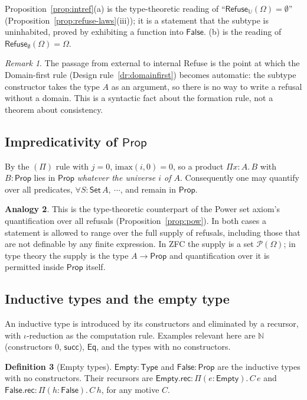 \documentclass[11pt]{article}
\newcommand{\Refuse}{\mathsf{Refuse}}
\newcommand{\U}{\mathbb{U}}
\newcommand{\Om}{\Omega}
\newcommand{\Prop}{\mathsf{Prop}}
\newcommand{\Type}{\mathsf{Type}}
\newcommand{\imax}{\mathrm{imax}}
\newcommand{\Pow}{\mathcal{P}}
\theoremstyle{definition}
\newtheorem{definition}{Definition}[section]
\newtheorem{analogy}[definition]{Analogy}
\theoremstyle{plain}
\theoremstyle{remark}
\newtheorem{remark}[definition]{Remark}
\begin{document}
Proposition~\ref{prop:intref}(a) is the type-theoretic reading of ``$\Refuse_{\U}(\Om)=\emptyset$'' (Proposition~\ref{prop:refuse-laws}(iii)); it is a statement that the subtype is uninhabited, proved by exhibiting a function into $\mathsf{False}$. (b) is the reading of $\Refuse_\emptyset(\Om)=\Om$.

\begin{remark}
The passage from external to internal Refuse is the point at which the Domain-first rule (Design rule~\ref{dr:domainfirst}) becomes automatic: the subtype constructor takes the type $A$ as an argument, so there is no way to write a refusal without a domain. This is a syntactic fact about the formation rule, not a theorem about consistency.
\end{remark}

\subsection{Impredicativity of $\Prop$}

By the $(\Pi)$ rule with $j=0$, $\imax(i,0)=0$, so a product $\Pi x{:}A.\,B$ with $B:\Prop$ lies in $\Prop$ \emph{whatever the universe $i$ of $A$}. Consequently one may quantify over all predicates, $\forall S:\mathsf{Set}\,A,\ \cdots$, and remain in $\Prop$.

\begin{analogy}\label{an:impred}
This is the type-theoretic counterpart of the Power set axiom's quantification over all refusals (Proposition~\ref{prop:pow}). In both cases a statement is allowed to range over the full supply of refusals, including those that are not definable by any finite expression. In ZFC the supply is a set $\Pow(\Om)$; in type theory the supply is the type $A\to\Prop$ and quantification over it is permitted inside $\Prop$ itself.
\end{analogy}

\subsection{Inductive types and the empty type}

An inductive type is introduced by its constructors and eliminated by a recursor, with $\iota$-reduction as the computation rule. Examples relevant here are $\mathbb{N}$ (constructors $0$, $\mathsf{succ}$), $\mathsf{Eq}$, and the types with no constructors.

\begin{definition}[Empty types]\label{def:empty}
$\mathsf{Empty}:\Type$ and $\mathsf{False}:\Prop$ are the inductive types with no constructors. Their recursors are $\mathsf{Empty.rec}:\Pi(e:\mathsf{Empty}).\,C\,e$ and $\mathsf{False.rec}:\Pi(h:\mathsf{False}).\,C\,h$, for any motive $C$.
\end{definition}
\end{document}
